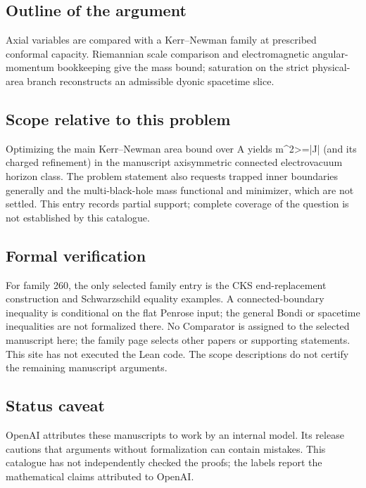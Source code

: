 \documentclass[11pt]{article}
\begin{document}
\subsection{Outline of the argument}
Axial variables are compared with a Kerr--Newman family at prescribed conformal capacity. Riemannian scale comparison and electromagnetic angular-momentum bookkeeping give the mass bound; saturation on the strict physical-area branch reconstructs an admissible dyonic spacetime slice.

\subsection{Scope relative to this problem}
Optimizing the main Kerr–Newman area bound over A yields m\textasciicircum{}2>=|J| (and its charged refinement) in the manuscript axisymmetric connected electrovacuum horizon class. The problem statement also requests trapped inner boundaries generally and the multi-black-hole mass functional and minimizer, which are not settled. This entry records partial support; complete coverage of the question is not established by this catalogue.

\subsection{Formal verification}
For family 260, the only selected family entry is the CKS end-replacement construction and Schwarzschild equality examples. A connected-boundary inequality is conditional on the flat Penrose input; the general Bondi or spacetime inequalities are not formalized there. No Comparator is assigned to the selected manuscript here; the family page selects other papers or supporting statements. This site has not executed the Lean code. The scope descriptions do not certify the remaining manuscript arguments.

\subsection{Status caveat}
OpenAI attributes these manuscripts to work by an internal model. Its release cautions that arguments without formalization can contain mistakes. This catalogue has not independently checked the proofs; the labels report the mathematical claims attributed to OpenAI.
\end{document}
